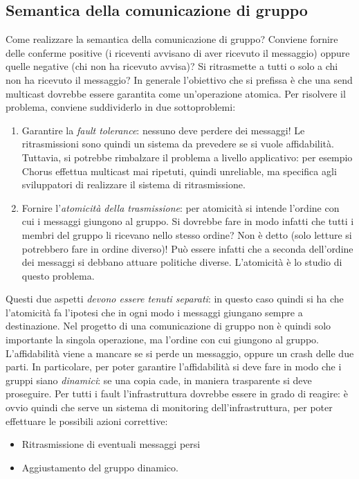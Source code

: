 \subsection{Semantica della comunicazione di gruppo}
Come realizzare la semantica della comunicazione di gruppo? Conviene fornire delle conferme positive (i riceventi
avvisano di aver ricevuto il messaggio) oppure quelle negative (chi non ha ricevuto avvisa)? Si ritrasmette a tutti o
solo a chi non ha ricevuto il messaggio?
In generale l'obiettivo che si prefissa è che una send multicast dovrebbe essere garantita come un'operazione atomica.
Per risolvere il problema, conviene suddividerlo in due sottoproblemi:
\begin{enumerate}
 \item Garantire la \textit{fault tolerance}: nessuno deve perdere dei messaggi! Le ritrasmissioni sono quindi un
 sistema da prevedere se si vuole affidabilità.
 Tuttavia, si potrebbe rimbalzare il problema a livello applicativo: per esempio Chorus effettua multicast mai
 ripetuti, quindi unreliable, ma specifica agli sviluppatori di realizzare il sistema di ritrasmissione.
 \item Fornire l'\textit{atomicità della trasmissione}: per atomicità si intende l'ordine con cui i messaggi giungono
 al gruppo. Si dovrebbe fare in modo infatti che tutti i membri del gruppo li ricevano nello stesso ordine? Non è
 detto (solo letture si potrebbero fare in ordine diverso)! Può essere infatti che a seconda dell'ordine dei messaggi
 si debbano attuare politiche diverse. L'atomicità è lo studio di questo problema.
\end{enumerate}
Questi due aspetti \textit{devono essere tenuti separati}: in questo caso quindi si ha che l'atomicità fa l'ipotesi
che in ogni modo i messaggi giungano sempre a destinazione. Nel progetto di una comunicazione di gruppo non è quindi
solo importante la singola operazione, ma l'ordine con cui giungono al gruppo.
L'affidabilità viene a mancare se si perde un messaggio, oppure un crash delle due parti. In particolare, per poter
garantire l'affidabilità si deve fare in modo che i gruppi siano \textit{dinamici}: se una copia cade, in maniera
trasparente si deve proseguire. Per tutti i fault l'infrastruttura dovrebbe essere in grado di reagire: è ovvio quindi
che serve un sistema di monitoring dell'infrastruttura, per poter effettuare le possibili azioni correttive:
\begin{itemize}
 \item Ritrasmissione di eventuali messaggi persi
 \item Aggiustamento del gruppo dinamico.
\end{itemize}
